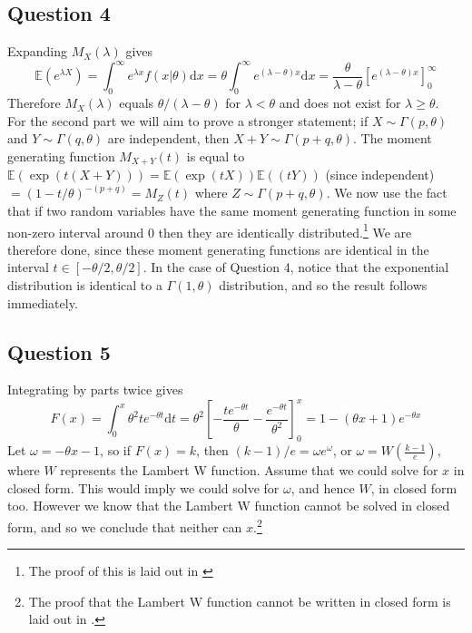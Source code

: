 \documentclass[10pt,a4paper,notitlepage]{article}
\newcommand{\E}[1]{\mathbb{E}\left(#1\right)}
\begin{document}
\subsection*{\centering Question 4}

Expanding $M_{X}(\lambda)$ gives
\begin{equation}
\E{e^{\lambda X}}=\int_{0}^{\infty}e^{\lambda x}f\left(x|\theta\right)\mathrm{d}x=\theta\int_{0}^{\infty}e^{(\lambda-\theta) x}\mathrm{d}x=\frac{\theta}{\lambda-\theta}\left[e^{(\lambda-\theta)x}\right]_{0}^{\infty}
\end{equation}
Therefore $M_{X}(\lambda)$ equals $\theta/(\lambda-\theta)$ for $\lambda<\theta$ and does not exist for $\lambda\geq \theta$.\\

For the second part we will aim to prove a stronger statement; if $X \sim \Gamma(p,\theta)$ and $Y\sim\Gamma(q,\theta)$ are independent, then $X+Y\sim\Gamma(p+q,\theta)$. The moment generating function $M_{X+Y}\left(t\right)$ is equal to $\E{\exp\left(t(X+Y)\right)}=\E{\exp\left(tX\right)}\E{\left(tY\right)}$ (since independent) $= \left(1-t/\theta\right)^{-(p+q)} = M_{Z}\left(t\right)$ where $Z\sim\Gamma\left(p+q,\theta\right)$. We now use the fact that if two random variables have the same moment generating function in some non-zero interval around 0 then they are identically distributed.\footnote{The proof of this is laid out in \cite{TheoryMG}} We are therefore done, since these moment generating functions are identical in the interval $t\in[-\theta/2,\theta/2]$. In the case of Question 4, notice that the exponential distribution is identical to a $\Gamma\left(1,\theta\right)$ distribution, and so the result follows immediately. 

\subsection*{\centering Question 5}
Integrating by parts twice gives
\begin{equation}\label{eq:6}
F(x)=\int^{x}_{0}\theta^{2}t e^{-\theta t}\mathrm{d}t=\theta^{2}\left[-\frac{te^{-\theta t}}{\theta}-\frac{e^{-\theta t}}{\theta^{2}}\right]^{x}_{0}=1-(\theta x+1)e^{-\theta x}
\end{equation}
Let $\omega = -\theta x-1$, so if $F(x)=k$, then $(k-1)/e=\omega e^{\omega}$, or $\omega=W\left(\frac{k-1}{e}\right)$, where $W$ represents the Lambert W function. Assume that we could solve for $x$ in closed form. This would imply we could solve for $\omega$, and hence $W$, in closed form too. However we know that the Lambert W function cannot be solved in closed form, and so we conclude that neither can $x$.\footnote{The proof that the Lambert W function cannot be written in closed form is laid out in \cite{Rosenlight1969}.}
\end{document}

